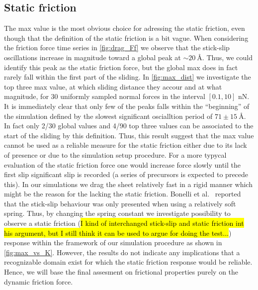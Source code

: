 \subsection{Static friction} 
The max value is the most obvious choice for adressing the static friction, even
though that the definition of the static friction is a bit vague. When
considering the friction force time series in \cref{fig:drag_Ff} we
observe that the stick-slip oscillations increase in magnitude toward a global
peak at $\sim \SI{20}{\text{Å}}$. Thus, we could identify this peak as the
static friction force, but the global max does in fact rarely fall within the
first part of the sliding. In \cref{fig:max_dist} we investigate the top
three max value, at which sliding distance they accour and at what magnitude,
for 30 uniformly sampled normal forces in the interval $[0.1, 10]$ nN. It is
immediately clear that only few of the peaks falls within the ``beginning'' of
the simulation defined by the slowest significant oscialltion period of $71\pm
\SI{15}{\text{Å}}$. In fact only 2/30 global values and 4/90 top three values
can be associated to the start of the sliding by this definition. Thus, this
result suggest that the max value cannot be used as a reliable measure for the
static friction either due to its lack of presence or due to the simulation
setup procedure. For a more typycal evaluation of the static friction force one
would increase force slowly until the first slip significant slip is recorded (a
series of precursors is expected to precede this). In our simulations we drag
the sheet relatively fast in a rigid manner which might be the reason for the lacking the static friction. Bonelli et al.\ \cite{bonelli_atomistic_2009} reported that the stick-slip behaviour was only presented when using a relatively soft spring. Thus, by changing the spring constant we investigate possibility to observe a static friction (\hl{I kind of interchanged stick-slip and static friction int his argument, but I still think it can be used to argue for doing the test...}) response within the framework of our simulation procedure as shown in
\cref{fig:max_vs_K}. However, the results do not indicate any implications
that a recognizable domain exist for which the static friction response would be
reliable. Hence, we will base the final assesment on frictional properties
purely on the dynamic friction force. 


